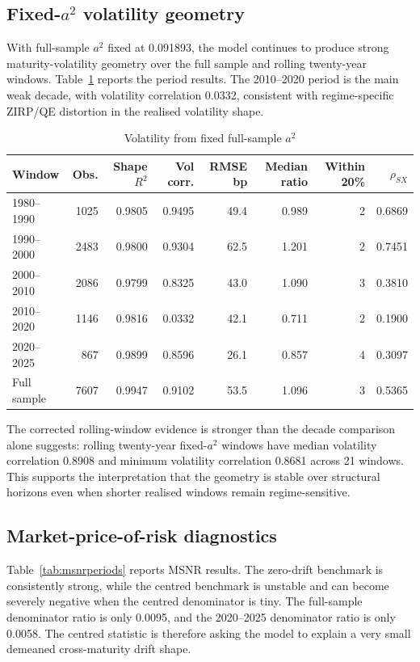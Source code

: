 \documentclass[11pt]{article}
\numberwithin{equation}{section}
\begin{document}
\subsection{Fixed-$a^2$ volatility geometry}
With full-sample $a^2$ fixed at 0.091893, the model continues to produce strong maturity-volatility geometry over the full sample and rolling twenty-year windows. Table~\ref{tab:test4} reports the period results. The 2010--2020 period is the main weak decade, with volatility correlation 0.0332, consistent with regime-specific ZIRP/QE distortion in the realised volatility shape.

\begin{table}[htbp]\centering\caption{Volatility from fixed full-sample $a^2$}\label{tab:test4}\begin{tabular}{lrrrrrrr}\toprule
Window&Obs.&Shape $R^2$&Vol corr.&RMSE bp&Median ratio&Within 20\%&$\rho_{SX}$\\\midrule
1980--1990&1025&0.9805&0.9495&49.4&0.989&2&0.6869\\
1990--2000&2483&0.9800&0.9304&62.5&1.201&2&0.7451\\
2000--2010&2086&0.9799&0.8325&43.0&1.090&3&0.3810\\
2010--2020&1146&0.9816&0.0332&42.1&0.711&2&0.1900\\
2020--2025&867&0.9899&0.8596&26.1&0.857&4&0.3097\\
Full sample&7607&0.9947&0.9102&53.5&1.096&3&0.5365\\\bottomrule\end{tabular}\end{table}

The corrected rolling-window evidence is stronger than the decade comparison alone suggests: rolling twenty-year fixed-$a^2$ windows have median volatility correlation 0.8908 and minimum volatility correlation 0.8681 across 21 windows. This supports the interpretation that the geometry is stable over structural horizons even when shorter realised windows remain regime-sensitive.

\subsection{Market-price-of-risk diagnostics}
Table~\ref{tab:msnrperiods} reports MSNR results. The zero-drift benchmark is consistently strong, while the centred benchmark is unstable and can become severely negative when the centred denominator is tiny. The full-sample denominator ratio is only 0.0095, and the 2020--2025 denominator ratio is only 0.0058. The centred statistic is therefore asking the model to explain a very small demeaned cross-maturity drift shape.
\end{document}
